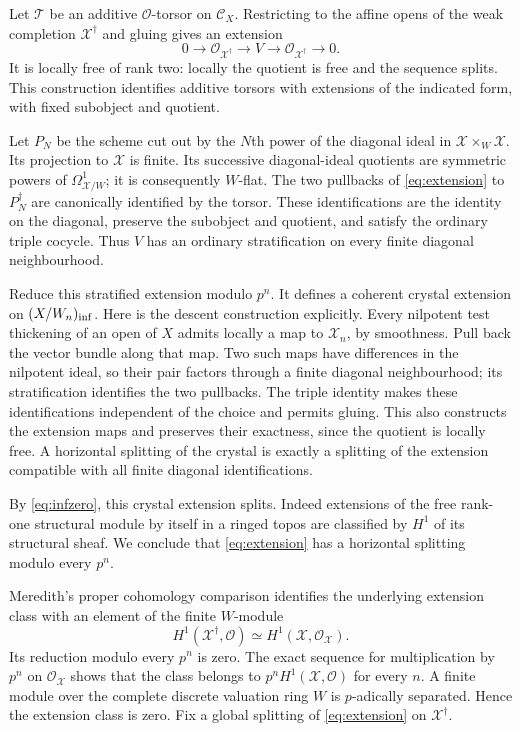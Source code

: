 \documentclass[11pt]{article}
\newcommand{\OO}{\mathcal O}\newcommand{\CC}{\mathcal C}
\theoremstyle{definition}\newtheorem{definition}[theorem]{Definition}
\theoremstyle{remark}\newtheorem{remark}[theorem]{Remark}
\begin{document}
Let $\mathcal T$ be an additive $\OO$-torsor on $\CC_X$. Restricting to the affine opens of the weak completion $\mathcal X^\dagger$ and gluing gives an extension
\begin{equation}\label{eq:extension}
 0\longrightarrow\OO_{\mathcal X^\dagger}
 \longrightarrow V\longrightarrow\OO_{\mathcal X^\dagger}
 \longrightarrow0.
\end{equation}
It is locally free of rank two: locally the quotient is free and the sequence splits. This construction identifies additive torsors with extensions of the indicated form, with fixed subobject and quotient.

Let $P_N$ be the scheme cut out by the $N$th power of the diagonal ideal in $\mathcal X\times_W\mathcal X$. Its projection to $\mathcal X$ is finite. Its successive diagonal-ideal quotients are symmetric powers of $\Omega^1_{\mathcal X/W}$; it is consequently $W$-flat. The two pullbacks of \eqref{eq:extension} to $P_N^\dagger$ are canonically identified by the torsor. These identifications are the identity on the diagonal, preserve the subobject and quotient, and satisfy the ordinary triple cocycle. Thus $V$ has an ordinary stratification on every finite diagonal neighbourhood.

Reduce this stratified extension modulo $p^n$. It defines a coherent crystal extension on $(X/W_n)_{\rm inf}$. Here is the descent construction explicitly. Every nilpotent test thickening of an open of $X$ admits locally a map to $\mathcal X_n$, by smoothness. Pull back the vector bundle along that map. Two such maps have differences in the nilpotent ideal, so their pair factors through a finite diagonal neighbourhood; its stratification identifies the two pullbacks. The triple identity makes these identifications independent of the choice and permits gluing. This also constructs the extension maps and preserves their exactness, since the quotient is locally free. A horizontal splitting of the crystal is exactly a splitting of the extension compatible with all finite diagonal identifications.

By \eqref{eq:infzero}, this crystal extension splits. Indeed extensions of the free rank-one structural module by itself in a ringed topos are classified by $H^1$ of its structural sheaf. We conclude that \eqref{eq:extension} has a horizontal splitting modulo every $p^n$.

Meredith's proper cohomology comparison identifies the underlying extension class with an element of the finite $W$-module
\[
 H^1(\mathcal X^\dagger,\OO)
       \simeq H^1(\mathcal X,\OO_{\mathcal X}).
\]
Its reduction modulo every $p^n$ is zero. The exact sequence for multiplication by $p^n$ on $\OO_{\mathcal X}$ shows that the class belongs to $p^nH^1(\mathcal X,\OO)$ for every $n$. A finite module over the complete discrete valuation ring $W$ is $p$-adically separated. Hence the extension class is zero. Fix a global splitting of \eqref{eq:extension} on $\mathcal X^\dagger$.
\end{document}
